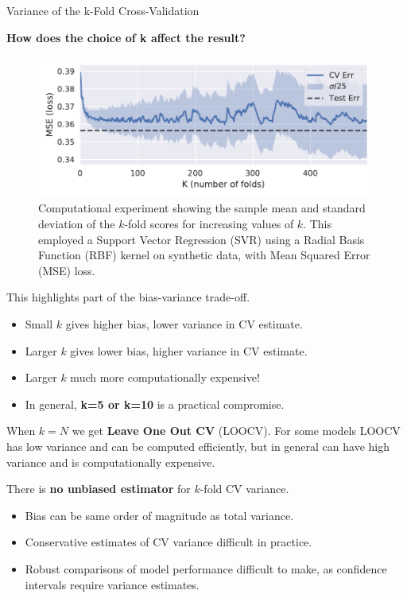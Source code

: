 \documentclass[final]{beamer}
\newlength{\onecolwid}
\begin{document}
\begin{frame}[t]
\begin{columns}[t]
\begin{column}{\onecolwid}
\begin{block}{Variance of the k-Fold Cross-Validation}
\begin{center}
\textcolor{lbnl-teal}{\bfseries How does the choice of k affect the result?}
\end{center}
\vspace{-0.25em}
\begin{figure}
    \centering
    \includegraphics[width=\linewidth]{plots/kfold-cv-std-6x3.pdf}
    \caption{Computational experiment showing the sample mean and standard deviation of the $k$-fold scores for increasing values of $k$. This employed a Support Vector Regression (SVR) using a Radial Basis Function (RBF) kernel on synthetic data, with Mean Squared Error (MSE) loss.}
    \label{fig:cv-var}
\end{figure}
\vspace{-0.5em}
This highlights part of the bias-variance trade-off.
\begin{itemize}
    \item Small $k$ gives higher bias, lower variance in CV estimate.
    \item Larger $k$ gives lower bias, higher variance in CV estimate.
    \item Larger $k$ much more computationally expensive!
    \item In general, \textcolor{lbnl-teal}{\bfseries k=5 or k=10} is a practical compromise. 
\end{itemize}
\vspace{0.25em}
 When $k=N$ we get  \textbf{Leave One Out CV} (LOOCV). 
For some models LOOCV has low variance and can be computed efficiently, but in general can have high variance and is computationally expensive.

\vspace{1.0em}

There is \textbf{no unbiased estimator} for $k$-fold CV variance.
\begin{itemize}
    \item Bias can be same order of magnitude as total variance.
    \item Conservative estimates of CV variance difficult in practice.
    \item Robust comparisons of model performance difficult to make, as confidence intervals require variance estimates.
\end{itemize}


\end{block}
\end{column}
\end{columns}
\end{frame}
\end{document}

